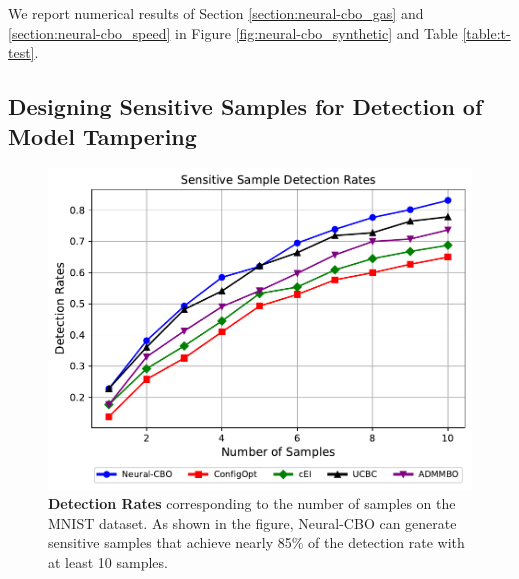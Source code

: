 We report numerical results of Section \ref{section:neural-cbo_gas} and  \ref{section:neural-cbo_speed} in Figure \ref{fig:neural-cbo_synthetic} and Table \ref{table:t-test}.
\subsection{Designing Sensitive Samples for Detection of Model Tampering}
\label{section:neural-cbo_sensitive_sample}
\begin{figure}[H]
    \centering
\includegraphics[width=\textwidth]{Figures/Neural-CBO/sensitive_sample_detection_rate.pdf}
    \caption{ \textbf{Detection Rates} corresponding to the number of samples on the MNIST dataset. As shown in the figure, Neural-CBO can generate sensitive samples that achieve nearly 85\% of the detection rate with at least 10 samples.}
    \label{fig:sensitive_sample}
\end{figure}

